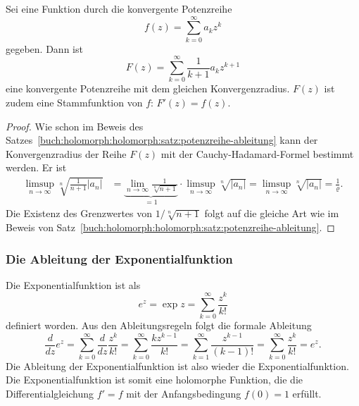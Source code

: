 \begin{satz}
\label{buch:holomorph:holomorph:satz:potenzreihe-stammfunktion}
%
Sei eine Funktion durch die konvergente Potenzreihe
\[
f(z)
=
\sum_{k=0}^\infty a_k z^k
\]
gegeben.
Dann ist
\begin{equation*}
F(z)
=
\sum_{k=0}^\infty \frac{1}{k+1}a_k z^{k+1}
\end{equation*}
eine konvergente Potenzreihe mit dem gleichen Konvergenzradius.
$F(z)$ ist zudem eine Stammfunktion von $f$: $F'(z)=f(z)$.
\end{satz}

\begin{proof}
Wie schon im Beweis des
Satzes~\ref{buch:holomorph:holomorph:satz:potenzreihe-ableitung}
kann der Konvergenzradius der Reihe $F(z)$ mit der Cauchy-Hadamard-Formel
bestimmt werden.
%
Er ist
\begin{align*}
\limsup_{n\to\infty} \!\sqrt[n]{\frac1{n+1}|a_n|}
&=
\underbrace{
\lim_{n\to\infty}
\frac{1}{\!\sqrt[n]{n+1}}
}_{\displaystyle =1}
\cdot
\limsup_{n\to\infty}
\!\sqrt[n]{|a_n|}
=
\limsup_{n\to\infty}
\!\sqrt[n]{|a_n|}
=
\frac{1}{\varrho}.
\end{align*}
Die Existenz des Grenzwertes von $1/\!\sqrt[n]{n+1}$ folgt auf die
gleiche Art wie im Beweis von
Satz~\ref{buch:holomorph:holomorph:satz:potenzreihe-ableitung}.
\end{proof}

%
%
\subsubsection{Die Ableitung der Exponentialfunktion}
Die Exponentialfunktion ist als
%
\begin{equation}
e^z
=
\exp z
=
\sum_{k=0}^\infty \frac{z^k}{k!}
\label{buch:holomorph:holomorph:eqn:exponentialfunktion}
\end{equation}
definiert worden.
Aus den Ableitungsregeln folgt die formale Ableitung
\[
\frac{d}{dz}
e^z
=
\sum_{k=0}^\infty \frac{d}{dz} \frac{z^k}{k!}
=
\sum_{k=0}^\infty \frac{kz^{k-1}}{k!}
=
\sum_{k=1}^\infty \frac{z^{k-1}}{(k-1)!}
=
\sum_{k=0}^\infty \frac{z^k}{k!}
=
e^z.
\]
Die Ableitung der Exponentialfunktion ist also wieder die
Exponentialfunktion.
Die Exponentialfunktion ist somit eine holomorphe Funktion,
die die Differentialgleichung $f'=f$ mit der Anfangsbedingung
$f(0)=1$ erfüllt.

%
%
